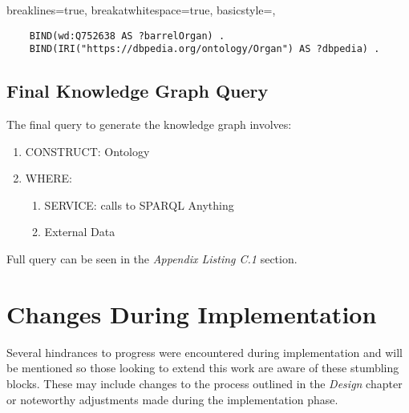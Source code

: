 \lstset
{
    breaklines=true,
    breakatwhitespace=true,
    basicstyle=\linespread{1.25}\ttfamily,
}
\begin{lstlisting}
    BIND(wd:Q752638 AS ?barrelOrgan) . 
    BIND(IRI("https://dbpedia.org/ontology/Organ") AS ?dbpedia) .
\end{lstlisting}

\subsection{Final Knowledge Graph Query}
\hspace*{0.5cm} The final query to generate the knowledge graph involves: 

\begin{enumerate}
    \item CONSTRUCT: Ontology
    \item WHERE:
    \begin{enumerate}
        \vspace{-0.25cm}
        \item SERVICE: calls to SPARQL Anything
        \item External Data
    \end{enumerate}
\end{enumerate}

Full query can be seen in the \textit{Appendix Listing C.1} section.

\section{Changes During Implementation}
\hspace{0.5cm} Several hindrances to progress were encountered during implementation and will be mentioned so those looking to extend this work are aware of these stumbling blocks. These may include changes to the process outlined in the \textit{Design} chapter or noteworthy adjustments made during the implementation phase.


